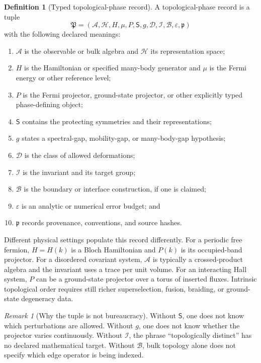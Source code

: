 \documentclass[11pt]{article}
\theoremstyle{definition}
\newtheorem{definition}[theorem]{Definition}
\theoremstyle{remark}
\newtheorem{remark}[theorem]{Remark}
\begin{document}
\begin{definition}[Typed topological-phase record]
\label{def:record}
A topological-phase record is a tuple
\[
 \mathfrak P
 =
 (\mathcal A,\mathcal H,H,\mu,P,\mathsf S,g,\mathcal D,
   \mathcal I,\mathcal B,\varepsilon,\mathfrak p)
\]
with the following declared meanings:
\begin{enumerate}[label=(\roman*)]
\item \(\mathcal A\) is the observable or bulk algebra and \(\mathcal H\)
  its representation space;
\item \(H\) is the Hamiltonian or specified many-body generator and \(\mu\)
  is the Fermi energy or other reference level;
\item \(P\) is the Fermi projector, ground-state projector, or other
  explicitly typed phase-defining object;
\item \(\mathsf S\) contains the protecting symmetries and their
  representations;
\item \(g\) states a spectral-gap, mobility-gap, or many-body-gap
  hypothesis;
\item \(\mathcal D\) is the class of allowed deformations;
\item \(\mathcal I\) is the invariant and its target group;
\item \(\mathcal B\) is the boundary or interface construction, if one is
  claimed;
\item \(\varepsilon\) is an analytic or numerical error budget; and
\item \(\mathfrak p\) records provenance, conventions, and source hashes.
\end{enumerate}
\end{definition}

Different physical settings populate this record differently.  For a
periodic free fermion, \(H=H(k)\) is a Bloch Hamiltonian and \(P(k)\) is its
occupied-band projector.  For a disordered covariant system, \(\mathcal A\)
is typically a crossed-product algebra and the invariant uses a trace per
unit volume.  For an interacting Hall system, \(P\) can be a ground-state
projector over a torus of inserted fluxes.  Intrinsic topological order
requires still richer superselection, fusion, braiding, or ground-state
degeneracy data.

\begin{remark}[Why the tuple is not bureaucracy]
Without \(\mathsf S\), one does not know which perturbations are allowed.
Without \(g\), one does not know whether the projector varies continuously.
Without \(\mathcal I\), the phrase ``topologically distinct'' has no
declared mathematical target.  Without \(\mathcal B\), bulk topology alone
does not specify which edge operator is being indexed.
\end{remark}
\end{document}

